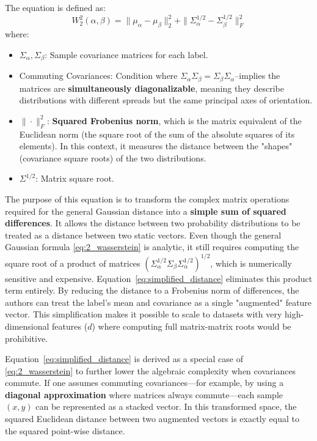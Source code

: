 \documentclass[11pt, a4paper]{article}
\theoremstyle{plain} %
\theoremstyle{definition} %
\begin{document}
			The equation is defined as:
			\begin{equation}
				\label{eq:simplified_distance}
				W_2^2(\alpha, \beta) = \|\mu_\alpha - \mu_\beta\|_2^2 + \|\Sigma_\alpha^{1/2} - \Sigma_\beta^{1/2}\|_F^2
			\end{equation}
			where:
			\begin{itemize}
				\item $\Sigma_\alpha, \Sigma_\beta$: Sample covariance matrices for each label.
				\item Commuting Covariances: Condition where $\Sigma_\alpha \Sigma_\beta = \Sigma_\beta \Sigma_\alpha$--implies the matrices are \textbf{simultaneously diagonalizable}, meaning they describe distributions with different spreads but the same principal axes of orientation.
				\item $\|\cdot\|_F^2$:  \textbf{Squared Frobenius norm}, which is the matrix equivalent of the Euclidean norm (the square root of the sum of the absolute squares of its elements). In this context, it measures the distance between the "shapes" (covariance square roots) of the two distributions.
				\item $\Sigma^{1/2}$: Matrix square root.
			\end{itemize}
			The purpose of this equation is to transform the complex matrix operations required for the general Gaussian distance into a \textbf{simple sum of squared differences}. It allows the distance between two probability distributions to be treated as a distance between two static vectors. Even though the general Gaussian formula \cref{eq:2_wasserstein} is analytic, it still requires computing the square root of a product of matrices $(\Sigma_\alpha^{1/2} \Sigma_\beta \Sigma_\alpha^{1/2})^{1/2}$, which is numerically sensitive and expensive. Equation~\ref{eq:simplified_distance} eliminates this product term entirely. By reducing the distance to a Frobenius norm of differences, the authors can treat the label's mean and covariance as a single "augmented" feature vector. This simplification makes it possible to scale to datasets with very high-dimensional features ($d$) where computing full matrix-matrix roots would be prohibitive.

			Equation~\ref{eq:simplified_distance} is derived as a special case of \cref{eq:2_wasserstein} to further lower the algebraic complexity when covariances commute. If one assumes commuting covariances---for example, by using a \textbf{diagonal approximation} where matrices always commute---each sample $(x, y)$ can be represented as a stacked vector. In this transformed space, the squared Euclidean distance between two augmented vectors is exactly equal to the squared point-wise distance.
	
\end{document}
